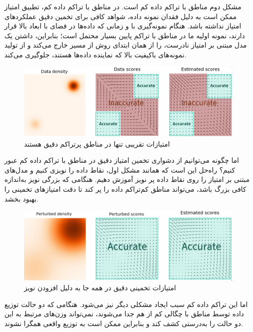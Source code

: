 \documentclass[12pt]{article}
\begin{document}
\begin{enumerate}
\begin{enumerate}
{\begin{figure}[h]
            \label{fig:q1_2_2}  
        \end{figure}
        مشکل دوم مناطق با تراکم داده کم  است. در مناطق با تراکم داده کم، تطبیق امتیاز ممکن است به دلیل فقدان نمونه داده، شواهد کافی برای تخمین دقیق عملکردهای امتیاز نداشته باشد. هنگام نمونه‌گیری با  و زمانی که داده‌ها در فضای با ابعاد بالا قرار دارند، نمونه اولیه ما در مناطق با تراکم پایین بسیار محتمل است؛ بنابراین، داشتن یک مدل مبتنی بر امتیاز نادرست،  را از همان ابتدای روش از مسیر خارج می‌کند و از تولید نمونه‌های باکیفیت بالا که نماینده داده‌ها هستند، جلوگیری می‌کند.
        \begin{figure}[h]
            \centering
            \includegraphics[width=\textwidth]{figs/Q1_2_3.png}
            \caption{امتیازات تقریبی تنها در مناطق پرتراکم دقیق هستند}
            \label{fig:q1_2_3}  
        \end{figure}
        اما چگونه می‌توانیم از دشواری تخمین امتیاز دقیق در مناطق با تراکم داده کم عبور کنیم؟ راه‌حل این است که همانند مشکل اول، نقاط داده را نویزی کنیم و مدل‌های مبتنی بر امتیاز را روی نقاط داده پر نویز آموزش دهیم.
        هنگامی که بزرگی نویز به‌اندازه کافی بزرگ باشد، می‌تواند مناطق کم‌تراکم داده را پر کند تا دقت امتیازهای تخمینی را بهبود بخشد.
        \begin{figure}[h]
            \centering
            \includegraphics[width=\textwidth]{figs/Q1_2_4.png}
            \caption{امتیازات تخمینی دقیق در همه جا به دلیل افزودن نویز}
            \label{fig:q1_2_4}  
        \end{figure}
        اما این تراکم داده کم سبب ایجاد مشکلی دیگر نیز می‌شود. هنگامی که دو حالت توزیع داده توسط مناطق با چگالی کم از هم جدا می‌شوند،  نمی‌تواند وزن‌های مرتبط به این دو حالت را به‌درستی کشف کند و بنابراین ممکن است به توزیع واقعی همگرا نشوند.  
}
\end{enumerate}
\end{enumerate}
\end{document}
